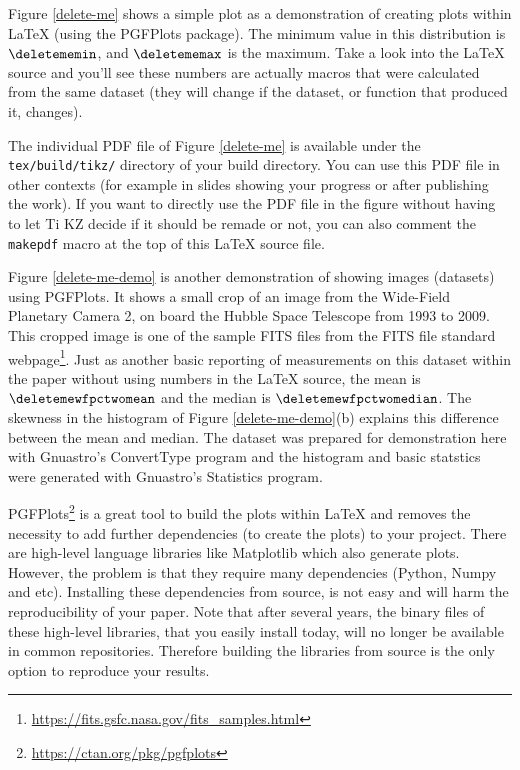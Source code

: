 \documentclass[10pt, twocolumn]{article}
\begin{document}
Figure \ref{delete-me} shows a simple plot as a demonstration of creating
plots within \LaTeX{} (using the {\small PGFP}lots package). The minimum
value in this distribution is $\deletememin$, and $\deletememax$ is the
maximum. Take a look into the \LaTeX{} source and you'll see these numbers
are actually macros that were calculated from the same dataset (they will
change if the dataset, or function that produced it, changes).

The individual {\small PDF} file of Figure \ref{delete-me} is available
under the \texttt{tex/build/tikz/} directory of your build directory. You
can use this PDF file in other contexts (for example in slides showing your
progress or after publishing the work). If you want to directly use the
{\small PDF} file in the figure without having to let {\small T}i{\small
  KZ} decide if it should be remade or not, you can also comment the
\texttt{makepdf} macro at the top of this \LaTeX{} source file.

\begin{figure}[t]

\end{figure}

Figure \ref{delete-me-demo} is another demonstration of showing images
(datasets) using PGFPlots. It shows a small crop of an image from the
Wide-Field Planetary Camera 2, on board the Hubble Space Telescope from
1993 to 2009. This cropped image is one of the sample FITS files from the
FITS file standard
webpage\footnote{\url{https://fits.gsfc.nasa.gov/fits_samples.html}}. Just
as another basic reporting of measurements on this dataset within the paper
without using numbers in the \LaTeX{} source, the mean is
$\deletemewfpctwomean$ and the median is $\deletemewfpctwomedian$. The
skewness in the histogram of Figure \ref{delete-me-demo}(b) explains this
difference between the mean and median. The dataset was prepared for
demonstration here with Gnuastro's \textsf{Convert\-Type} program and the
histogram and basic statstics were generated with Gnuastro's
\textsf{Statistics} program.

{\small PGFP}lots\footnote{\url{https://ctan.org/pkg/pgfplots}} is a great
tool to build the plots within \LaTeX{} and removes the necessity to add
further dependencies (to create the plots) to your project. There are
high-level language libraries like Matplotlib which also generate
plots. However, the problem is that they require many dependencies (Python,
Numpy and etc). Installing these dependencies from source, is not easy and
will harm the reproducibility of your paper. Note that after several years,
the binary files of these high-level libraries, that you easily install
today, will no longer be available in common repositories. Therefore
building the libraries from source is the only option to reproduce your
results.
\end{document}
